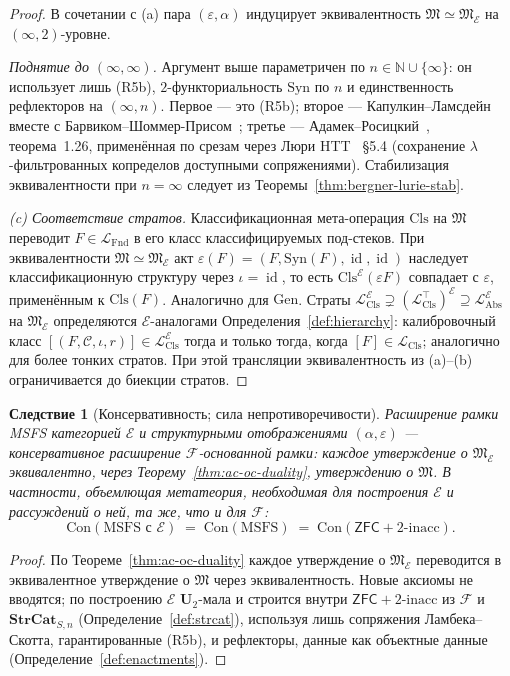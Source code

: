 \documentclass[11pt]{article}
\theoremstyle{plain}
\newtheorem{corollary}[theorem]{Следствие}
\theoremstyle{definition}
\newcommand{\cF}{\mathcal{F}}
\newcommand{\cC}{\mathcal{C}}
\newcommand{\fM}{\mathfrak{M}}
\newcommand{\LFnd}{\mathcal{L}_{\mathrm{Fnd}}}
\newcommand{\LCls}{\mathcal{L}_{\mathrm{Cls}}}
\newcommand{\LClsMax}{\mathcal{L}_{\mathrm{Cls}}^{\top}}
\newcommand{\LAbs}{\mathcal{L}_{\mathrm{Abs}}}
\newcommand{\Syn}{\mathrm{Syn}}
\newcommand{\Con}{\mathrm{Con}}
\newcommand{\ZFC}{\mathsf{ZFC}}
\newcommand{\cE}{\mathcal{E}}
\newcommand{\LAbsE}{\LAbs^{\cE}}
\newcommand{\LClsE}{\LCls^{\cE}}
\newcommand{\LClsMaxE}{(\LClsMax)^{\cE}}
\DeclareMathOperator{\id}{id}
\begin{document}
\begin{proof}
В сочетании с (a) пара $(\varepsilon, \alpha)$ индуцирует эквивалентность $\fM \simeq \fM_\cE$ на $(\infty, 2)$-уровне.

\emph{Поднятие до $(\infty, \infty)$.} Аргумент выше параметричен по $n \in \mathbb{N} \cup \{\infty\}$: он использует лишь (R5b), $2$-функториальность $\Syn$ по $n$ и единственность рефлекторов на $(\infty, n)$. Первое — это (R5b); второе — Капулкин--Ламсдейн~\cite{KapulkinLumsdaine2021} вместе с Барвиком--Шоммер-Присом~\cite{BarwickSchommerPries2021}; третье — Адамек--Росицкий~\cite{AdamekRosicky1994}, теорема~1.26, применённая по срезам через Люри HTT~\cite{LurieHTT} \S 5.4 (сохранение $\lambda$-фильтрованных копределов доступными сопряжениями). Стабилизация эквивалентности при $n = \infty$ следует из Теоремы~\ref{thm:bergner-lurie-stab}.

\emph{(c) Соответствие стратов.} Классификационная мета-операция $\mathrm{Cls}$ на $\fM$ переводит $F \in \LFnd$ в его класс классифицируемых под-стеков. При эквивалентности $\fM \simeq \fM_\cE$ акт $\varepsilon(F) = (F, \Syn(F), \id, \id)$ наследует классификационную структуру через $\iota = \id$, то есть $\mathrm{Cls}^\cE(\varepsilon F)$ совпадает с $\varepsilon$, применённым к $\mathrm{Cls}(F)$. Аналогично для $\mathrm{Gen}$. Страты $\LClsE \supsetneq \LClsMaxE \supseteq \LAbsE$ на $\fM_\cE$ определяются $\cE$-аналогами Определения~\ref{def:hierarchy}: калибровочный класс $[(F, \cC, \iota, r)] \in \LClsE$ тогда и только тогда, когда $[F] \in \LCls$; аналогично для более тонких стратов. При этой трансляции эквивалентность из (a)--(b) ограничивается до биекции стратов.
\end{proof}

\begin{corollary}[Консервативность; сила непротиворечивости]\label{cor:ac-oc-conservativity}
Расширение рамки MSFS категорией $\cE$ и структурными отображениями $(\alpha, \varepsilon)$ — консервативное расширение $\cF$-основанной рамки: каждое утверждение о $\fM_\cE$ эквивалентно, через Теорему~\ref{thm:ac-oc-duality}, утверждению о $\fM$. В частности, объемлющая метатеория, необходимая для построения $\cE$ и рассуждений о ней, та же, что и для $\cF$:
\[
  \Con(\text{MSFS с } \cE) \;=\; \Con(\text{MSFS}) \;=\; \Con(\ZFC + 2\text{-inacc}).
\]
\end{corollary}

\begin{proof}
По Теореме~\ref{thm:ac-oc-duality} каждое утверждение о $\fM_\cE$ переводится в эквивалентное утверждение о $\fM$ через эквивалентность. Новые аксиомы не вводятся; по построению $\cE$ $\mathbf{U}_2$-мала и строится внутри $\ZFC + 2\text{-inacc}$ из $\cF$ и $\mathbf{StrCat}_{S, n}$ (Определение~\ref{def:strcat}), используя лишь сопряжения Ламбека--Скотта, гарантированные (R5b), и рефлекторы, данные как объектные данные (Определение~\ref{def:enactments}).
\end{proof}
\end{document}
